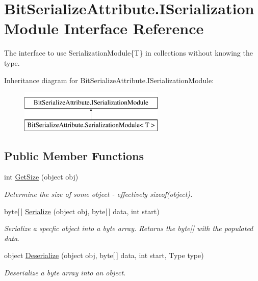 \hypertarget{interface_bit_serialize_attribute_1_1_i_serialization_module}{\section{Bit\-Serialize\-Attribute.\-I\-Serialization\-Module Interface Reference}
\label{interface_bit_serialize_attribute_1_1_i_serialization_module}
}


The interface to use Serialization\-Module\{\-T\} in collections without knowing the type.  


Inheritance diagram for Bit\-Serialize\-Attribute.\-I\-Serialization\-Module\-:\begin{figure}[H]
\begin{center}
\leavevmode
\includegraphics[height=2.000000cm]{interface_bit_serialize_attribute_1_1_i_serialization_module}
\end{center}
\end{figure}
\subsection*{Public Member Functions}
\begin{DoxyCompactItemize}
\item 
int \hyperlink{interface_bit_serialize_attribute_1_1_i_serialization_module_a057ba8b3168eb8a0999a329cca222cea}{Get\-Size} (object obj)
\begin{DoxyCompactList}\small\item\em Determine the size of some object -\/ effectively sizeof(object). \end{DoxyCompactList}\item 
byte\mbox{[}$\,$\mbox{]} \hyperlink{interface_bit_serialize_attribute_1_1_i_serialization_module_ad3b3d5f329538f550958a8342d9e0708}{Serialize} (object obj, byte\mbox{[}$\,$\mbox{]} data, int start)
\begin{DoxyCompactList}\small\item\em Serialize a specfic object into a byte array. Returns the byte\mbox{[}\mbox{]} with the populated data. \end{DoxyCompactList}\item 
object \hyperlink{interface_bit_serialize_attribute_1_1_i_serialization_module_a9c1c3c1a875354c8d3320e99c63da4a4}{Deserialize} (object obj, byte\mbox{[}$\,$\mbox{]} data, int start, Type type)
\begin{DoxyCompactList}\small\item\em Deserialize a byte array into an object. \end{DoxyCompactList}\end{DoxyCompactItemize}


